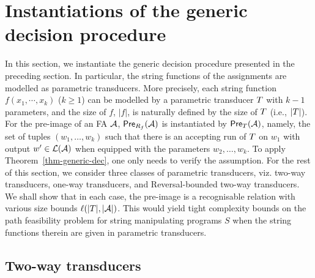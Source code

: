 
\section{Instantiations of the generic decision procedure}\label{sec-instan}

In this section, we instantiate the generic decision procedure presented in the preceding section. In particular, the string functions of the assignments are modelled as parametric transducers. More precisely, each string function $f(x_1, \cdots, x_k)$ ($k\geq 1$) can be modelled by a parametric transducer $T$  
with $k-1$ parameters, and the size of $f$, $|f|$, is naturally defined by the size of $T$ (i.e., $|T|$). For the pre-image of an FA $\mathcal{A}$,  $\textsf{Pre}_{R_f}(\mathcal{A})$ is instantiated by $\textsf{Pre}_{T}(\mathcal{A})$, namely, the set of tuples $(w_1,\ldots, w_k)$ such that there is an accepting run of $T$ on $w_1$ with output $w'\in \mathcal{L}(\mathcal{A})$ when equipped with the parameters $w_2,\ldots, w_k$. To apply Theorem~\ref{thm-generic-dec}, one only needs to verify the \prerec{} assumption. 
For the rest of this section, we consider three classes of parametric transducers, viz. two-way transducers, one-way transducers, and Reversal-bounded two-way transducers. We shall show that in each case, the pre-image is a recognisable relation with various size bounds $\ell(|T|, |\mathcal{A}|)$. This would yield tight complexity bounds on the path feasibility problem for string manipulating programs $S$ when the string functions therein are given in parametric transducers.  



 
\subsection{Two-way transducers}\label{sec-2way}



